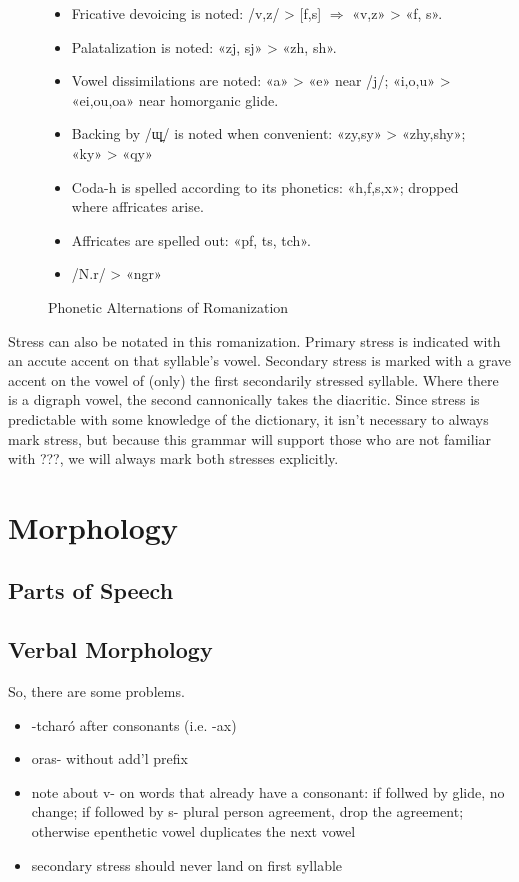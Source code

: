 \documentclass[12pt]{book} %
\begin{document}
\begin{figure}[H]
\begin{itemize}
\item Fricative devoicing is noted: /v,z/ > [f,s] $\Rightarrow$ «v,z» > «f, s».
\item Palatalization is noted: «zj, sj» > «zh, sh».
\item Vowel dissimilations are noted: «a» > «e» near /j/; «i,o,u» > «ei,{\color{orange}ou,oa}» near homorganic glide.
\item Backing by /ɰ̠/ is noted when convenient: «zy,sy» > «zhy,shy»; «ky» > «qy»
\item Coda-h is spelled according to its phonetics: «h,f,s,x»; dropped where affricates arise.
\item Affricates are spelled out: «pf, ts, tch».
\item{\color{orange}/N.r/ > «ngr»}
\end{itemize}
\caption{Phonetic Alternations of Romanization}\label{t:phonetic-spelling}
\end{figure}


Stress can also be notated in this romanization.
Primary stress is indicated with an accute accent on that syllable's vowel.
Secondary stress is marked with a grave accent on the vowel of (only) the first secondarily stressed syllable.
Where there is a digraph vowel, the second cannonically takes the diacritic.
Since stress is predictable with some knowledge of the dictionary, it isn't necessary to always mark stress, but because this grammar will support those who are not familiar with ???, we will always mark both stresses explicitly.





\chapter{Morphology}

\section{Parts of Speech}

\section{Verbal Morphology}

{\color{red}
So, there are some problems.
\begin{itemize}
\item -tcharó after consonants (i.e. -ax)
\item oras- without add'l prefix
\item note about v- on words that already have a consonant: {\color{orange}if follwed by glide, no change; if followed by s- plural person agreement, drop the agreement; otherwise epenthetic vowel duplicates the next vowel}
\item secondary stress should never land on first syllable
\end{itemize}
}
\end{document}
